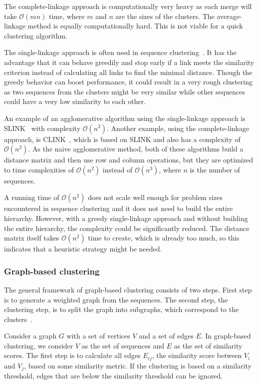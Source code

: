 The complete-linkage approach is computationally very heavy as each merge will
take $\mathcal{O}(mn)$ time, where $m$ and $n$ are the sizes of the clusters.
The average-linkage method is equally computationally hard. This is not viable
for a quick clustering algorithm.

The single-linkage approach is often used in sequence
clustering~\cite[pp.~62--63]{dong}. It has the advantage that it can behave
greedily and stop early if a link meets the similarity criterion instead of
calculating all links to find the minimal distance. Though the greedy behavior
can boost performance, it could result in a very rough clustering as two
sequences from the clusters might be very similar while other sequences could
have a very low similarity to each other.

An example of an agglomerative algorithm using the single-linkage approach is
SLINK~\cite{sibson} with complexity $\mathcal{O}\left(n^2\right)$. Another
example, using the complete-linkage approach, is CLINK~\cite{defays}, which is
based on SLINK and also has a complexity of $\mathcal{O}\left(n^2\right)$. As
the naive agglomerative method, both of these algorithms build a distance
matrix and then use row and column operations, but they are optimized to time
complexities of $\mathcal{O}\left(n^2\right)$ instead of
$\mathcal{O}\left(n^3\right)$, where $n$ is the number of sequences.

A running time of $\mathcal{O}\left(n^2\right)$ does not scale well enough for
problem sizes encountered in sequence clustering and it does not need to build
the entire hierarchy. However, with a greedy single-linkage approach and
without building the entire hierarchy, the complexity could be significantly
reduced. The distance matrix itself takes $\mathcal{O}\left(n^2\right)$ time
to create, which is already too much, so this indicates that a heuristic
strategy might be needed.


\subsubsection{Graph-based clustering}

The general framework of graph-based clustering consists of two steps. First
step is to generate a weighted graph from the sequences. The second step, the
clustering step, is to split the graph into subgraphs, which correspond to the
clusters~\cite[pp. 64-65]{dong}.

Consider a graph $G$ with a set of vertices $V$ and a set of edges $E$. In
graph-based clustering, we consider $V$ as the set of sequences and $E$ as the
set of similarity scores. The first step is to calculate all edges $E_{ij}$,
the similarity score between $V_i$ and $V_j$, based on some similarity metric.
If the clustering is based on a similarity threshold, edges that are below the
similarity threshold can be ignored.

